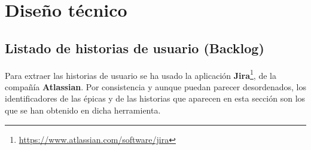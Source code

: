 \chapter{Diseño técnico}



\section{Listado de historias de usuario (Backlog)}

Para extraer las historias de usuario se ha usado la aplicación \textbf{Jira}\footnote{\url{https://www.atlassian.com/software/jira}}, de la compañía \textbf{Atlassian}. Por consistencia y aunque puedan parecer desordenados, los identificadores de las épicas y de las historias que aparecen en esta sección son los que se han obtenido en dicha herramienta.

